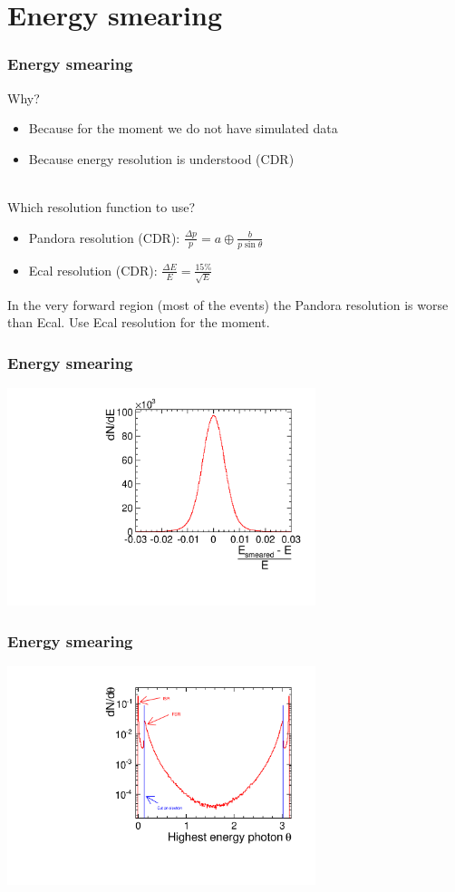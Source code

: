 \documentclass{beamer}
\begin{document}
\section{Energy smearing}
\begin{frame}
\frametitle{Energy smearing}
Why?
\begin{itemize}
  \item Because for the moment we do not have simulated data
  \item Because energy resolution is understood (CDR)
\end{itemize}
~\\
Which resolution function to use?
\begin{itemize}
  \item Pandora resolution (CDR): $\frac{\Delta p}{p} = a \oplus
  \frac{b}{p\sin\theta}$
  \item Ecal resolution (CDR): $\frac{\Delta E}{E} = \frac{15\%}{\sqrt{E}}$
\end{itemize}
In the very forward region (most of the events) the Pandora resolution is worse
than Ecal. \alert{Use Ecal resolution for the moment.}
\end{frame}
\begin{frame}
\frametitle{Energy smearing}
\includegraphics[width=9cm]{Smearing}
\end{frame}
\begin{frame}
\frametitle{Energy smearing}
\includegraphics[width=9cm,page=9]{BHWideAnalysis.pdf}
\end{frame}
\end{document}

